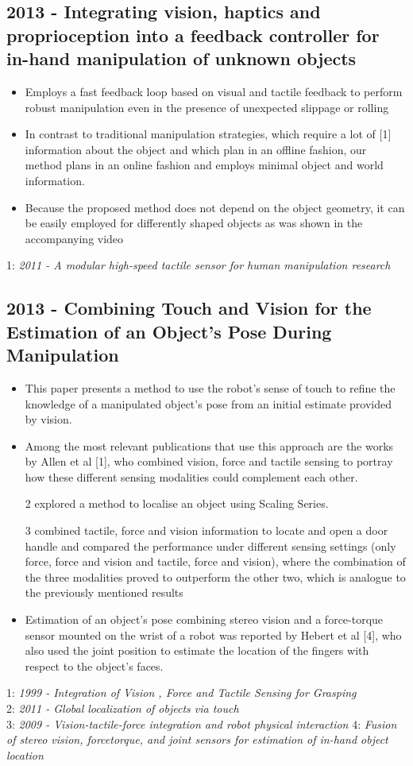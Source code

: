 \subsection{2013 - Integrating vision, haptics and proprioception into a feedback controller for in-hand manipulation of unknown objects}
\begin{itemize}
\item Employs a fast feedback loop based on visual and tactile feedback to perform robust manipulation even in the presence of unexpected slippage or rolling
\item In contrast to
traditional manipulation strategies, which require a lot of
[1] information about the object and which plan in an offline
fashion, our method plans in an online fashion and employs minimal object and world information. 
\item Because the proposed method does not depend on the object geometry, it can be easily employed for differently shaped objects as was shown in the accompanying video
\end{itemize}
1: \textit{2011 - A modular high-speed tactile sensor for human manipulation research}

\subsection{2013 - Combining Touch and Vision for the Estimation of an Object’s Pose During Manipulation}
\begin{itemize}
\item This paper presents a method to use the robot’s sense of touch to refine the knowledge of a manipulated object’s pose from an initial estimate provided by vision. 
\item Among the most relevant publications that use this approach are the works by Allen et al [1], who combined vision, force and tactile sensing to portray how these different sensing modalities could complement each other.
\item [2] explored a method
to localise an object using Scaling Series.
\item [3] combined tactile, force and vision information to locate and open a door handle and compared the performance under different sensing settings (only force, force and vision and tactile, force and vision), where the combination of the three modalities proved to outperform the other two, which is analogue to the previously mentioned results
\item  Estimation of an object’s pose combining stereo vision and a force-torque sensor mounted on the wrist of a robot was reported by Hebert et al [4], who also used the joint position to estimate the location of the fingers with respect to the object’s faces.
\end{itemize}
1: \textit{1999 - Integration of
Vision , Force and Tactile Sensing for Grasping} \\
2: \textit{2011 - Global localization of objects via
touch} \\
3: \textit{2009 - Vision-tactile-force integration and robot physical interaction}
4: \textit{Fusion of stereo vision, forcetorque,
and joint sensors for estimation of in-hand object location}

